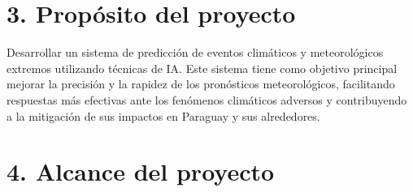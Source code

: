 \documentclass[
11pt, %
codirector, %
]{charter}
\begin{document}
\section{3. Propósito del proyecto}
\label{sec:proposito}

Desarrollar un sistema de predicción de eventos climáticos y meteorológicos extremos utilizando técnicas de IA. Este sistema tiene como objetivo principal mejorar la precisión y la rapidez de los pronósticos meteorológicos, facilitando respuestas más efectivas ante los fenómenos climáticos adversos y contribuyendo a la mitigación de sus impactos en Paraguay y sus alrededores.

\section{4. Alcance del proyecto}
\label{sec:alcance}
\end{document}
